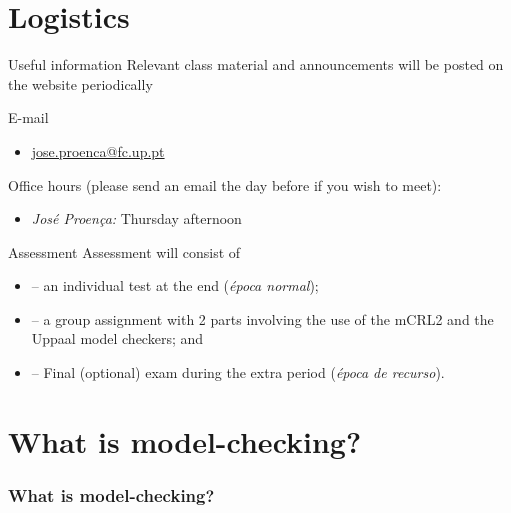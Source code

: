 \documentclass[aspectratio=169]{beamer}
\begin{document}
\section{Logistics}

\begin{frame}{Useful information}
  Relevant class material and announcements will be posted on the website periodically

  

  \alert{E-mail}
    \begin{itemize}
      \item \href{mailto:jose.proenca@fc.up.pt}{jose.proenca@fc.up.pt} 
    \end{itemize}
           

  \alert{Office hours} (please send an email the day before if you wish to meet):
  \begin{itemize}
    \item \emph{José Proença:} Thursday afternoon
  \end{itemize} 
\end{frame}

\begin{frame}{Assessment}
  Assessment will consist of
  \begin{itemize}
  \item {} -- an individual \alert{test} at the end (\emph{época normal});
  \item {} -- a \alert{group assignment} with 2 parts involving the use of the mCRL2 and the Uppaal model checkers; and %
  \item {} -- Final (optional) exam during the extra period (\emph{época de recurso}).
  \end{itemize}
\end{frame}


\section{What is model-checking?}


\begin{frame}[t]\frametitle{What is model-checking?}


  \medskip


\end{frame}
\end{document}
